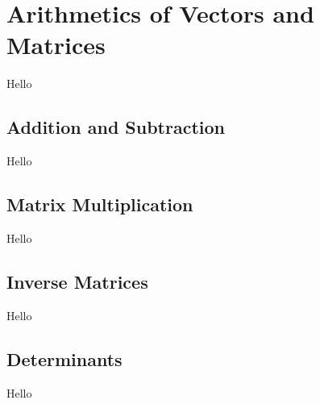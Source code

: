 \chapter{Arithmetics of Vectors and Matrices}
Hello

\section{Addition and Subtraction}
Hello

\section{Matrix Multiplication}
Hello

\section{Inverse Matrices}
Hello

\section{Determinants}
Hello
